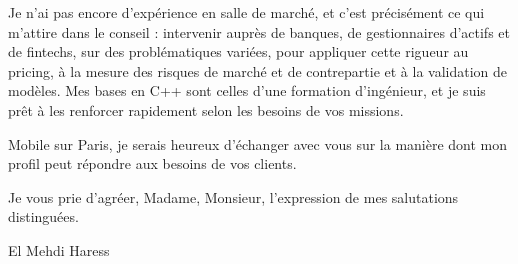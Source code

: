 \documentclass[11pt,a4paper]{article}
\begin{document}
Je n'ai pas encore d'expérience en salle de marché, et c'est précisément ce qui m'attire dans le conseil :
intervenir auprès de banques, de gestionnaires d'actifs et de fintechs, sur des problématiques variées,
pour appliquer cette rigueur au pricing, à la mesure des risques de marché et de contrepartie et à la
validation de modèles. Mes bases en \mbox{C++} sont celles d'une formation d'ingénieur, et je suis prêt à
les renforcer rapidement selon les besoins de vos missions.

Mobile sur Paris, je serais heureux d'échanger avec vous sur la manière dont mon profil peut répondre aux
besoins de vos clients.

Je vous prie d'agréer, Madame, Monsieur, l'expression de mes salutations distinguées.

\vspace{0.6ex}
El Mehdi Haress
\end{document}
